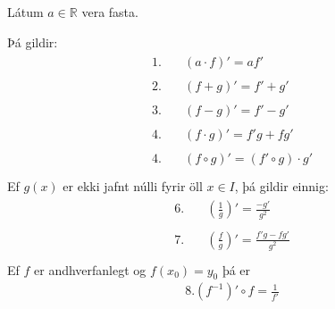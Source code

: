 \documentclass[a4paper,10pt,icelandic]{sphinxmanual}
\begin{document}
Látum \(a\in \mathbb{R}\) vera fasta.

Þá gildir:
\begin{equation*}
\begin{split}\begin{aligned}
1.& \quad (a\cdot f)'=af' \\
&\\
2.& \quad (f+g)'=f'+g' \\
&\\
3.& \quad (f-g)'=f'-g' \\
&\\
4.& \quad (f\cdot g)'=f'g+fg' \\
&\\
4.& \quad (f\circ g)'=(f'\circ g)\cdot g' \\
\end{aligned}\end{split}
\end{equation*}
Ef \(g(x)\) er ekki jafnt núlli fyrir öll \(x\in I\), þá gildir einnig:
\begin{equation*}
\begin{split}\begin{aligned}
6.& \quad \left(\frac{1}{g}\right)'=\frac{-g'}{g^2} \\
&\\
7.& \quad \left(\frac{f}{g}\right)'=\frac{f'g-fg'}{g^2} \\
\end{aligned}\end{split}
\end{equation*}
Ef \(f\) er andhverfanlegt og \(f(x_0)=y_0\) þá er
\begin{equation*}
\begin{split}8. (f^{-1})'\circ f=\frac{1}{f'}\end{split}
\end{equation*}
\end{document}
